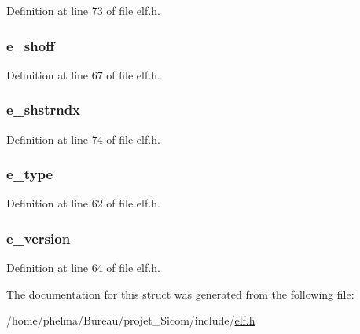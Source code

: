 Definition at line 73 of file elf.\-h.

\hypertarget{struct_elf64___ehdr_a3c54b0a9a6679e31282496a396d171f2}{
\subsubsection[{e\-\_\-shoff}]{ e\-\_\-shoff}}\label{struct_elf64___ehdr_a3c54b0a9a6679e31282496a396d171f2}


Definition at line 67 of file elf.\-h.

\hypertarget{struct_elf64___ehdr_a4534680060068929d792d8cd35fc91fc}{
\subsubsection[{e\-\_\-shstrndx}]{ e\-\_\-shstrndx}}\label{struct_elf64___ehdr_a4534680060068929d792d8cd35fc91fc}


Definition at line 74 of file elf.\-h.

\hypertarget{struct_elf64___ehdr_a1d0b03fb2f1085bb3e078a0394e473bc}{
\subsubsection[{e\-\_\-type}]{ e\-\_\-type}}\label{struct_elf64___ehdr_a1d0b03fb2f1085bb3e078a0394e473bc}


Definition at line 62 of file elf.\-h.

\hypertarget{struct_elf64___ehdr_af783d809d1f8907fb08e0f84f07894ab}{
\subsubsection[{e\-\_\-version}]{ e\-\_\-version}}\label{struct_elf64___ehdr_af783d809d1f8907fb08e0f84f07894ab}


Definition at line 64 of file elf.\-h.



The documentation for this struct was generated from the following file\-:\begin{DoxyCompactItemize}
\item 
/home/phelma/\-Bureau/projet\-\_\-\-Sicom/include/\hyperlink{elf_8h}{elf.\-h}\end{DoxyCompactItemize}
